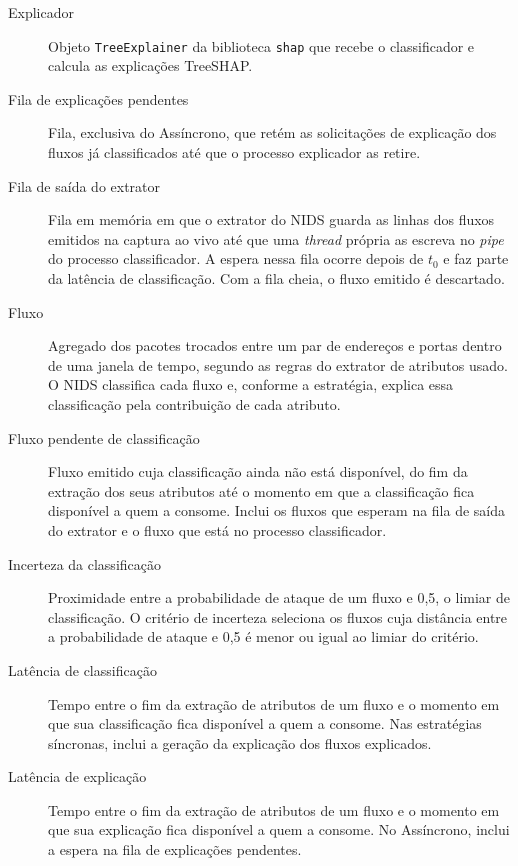 \documentclass[
  12pt,
  oneside,
  a4paper,
  chapter=TITLE,
  sumario=tradicional,
  english,
  brazil
]{abntex2}
\begin{document}
\begin{description}
  \item[Explicador]\label{gl:explicador} Objeto \texttt{TreeExplainer} da biblioteca \texttt{shap} que recebe o classificador e calcula as explicações TreeSHAP.
  \item[Fila de explicações pendentes]\label{gl:fila-explicacoes} Fila, exclusiva do Assíncrono, que retém as solicitações de explicação dos fluxos já classificados até que o processo explicador as retire.
  \item[Fila de saída do extrator]\label{gl:fila-extrator} Fila em memória em que o extrator do NIDS guarda as linhas dos fluxos emitidos na captura ao vivo até que uma \emph{thread} própria as escreva no \emph{pipe} do processo classificador. A espera nessa fila ocorre depois de $t_0$ e faz parte da latência de classificação. Com a fila cheia, o fluxo emitido é descartado.
  \item[Fluxo]\label{gl:fluxo} Agregado dos pacotes trocados entre um par de endereços e portas dentro de uma janela de tempo, segundo as regras do extrator de atributos usado. O NIDS classifica cada fluxo e, conforme a estratégia, explica essa classificação pela contribuição de cada atributo.
  \item[Fluxo pendente de classificação]\label{gl:fluxo-pendente} Fluxo emitido cuja classificação ainda não está disponível, do fim da extração dos seus atributos até o momento em que a classificação fica disponível a quem a consome. Inclui os fluxos que esperam na fila de saída do extrator e o fluxo que está no processo classificador.
  \item[Incerteza da classificação]\label{gl:incerteza} Proximidade entre a probabilidade de ataque de um fluxo e 0,5, o limiar de classificação. O critério de incerteza seleciona os fluxos cuja distância entre a probabilidade de ataque e 0,5 é menor ou igual ao limiar do critério.
  \item[Latência de classificação]\label{gl:latencia-classificacao} Tempo entre o fim da extração de atributos de um fluxo e o momento em que sua classificação fica disponível a quem a consome. Nas estratégias síncronas, inclui a geração da explicação dos fluxos explicados.
  \item[Latência de explicação]\label{gl:latencia-explicacao} Tempo entre o fim da extração de atributos de um fluxo e o momento em que sua explicação fica disponível a quem a consome. No Assíncrono, inclui a espera na fila de explicações pendentes.

\end{description}
\end{document}
